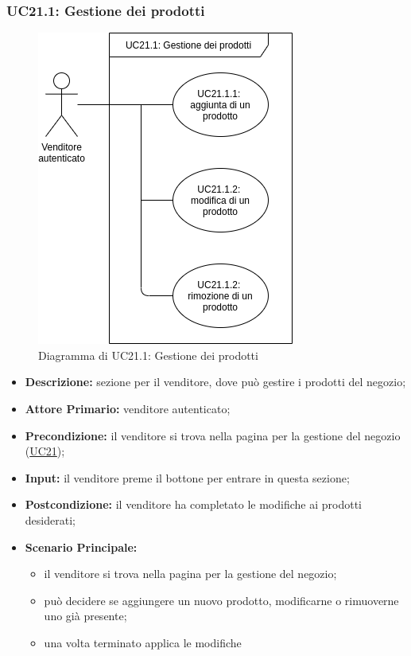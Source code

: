         \subsubsection{UC21.1: Gestione dei prodotti}
        \label{sec:UC21.1}
        \begin{figure}[!ht]
            \caption{Diagramma di UC21.1: Gestione dei prodotti}
            \vspace{10px}
            \includegraphics[scale=0.5]{../../../Images/AnalisiRequisiti/UC21.1}
            \centering
        \end{figure}
        \begin{itemize}
            \item \textbf{Descrizione:} sezione per il venditore, dove può gestire i prodotti del negozio;
            \item \textbf{Attore Primario:} venditore autenticato;
            \item \textbf{Precondizione:} il venditore si trova nella pagina per la gestione del negozio (\hyperref[sec:UC21]{UC21});
            \item \textbf{Input:} il venditore preme il bottone per entrare in questa sezione;
            \item \textbf{Postcondizione:} il venditore ha completato le modifiche ai prodotti desiderati;
            \item \textbf{Scenario Principale:} 
                \begin{itemize}
                    \item il venditore si trova nella pagina per la gestione del negozio;
                    \item può decidere se aggiungere un nuovo prodotto, modificarne o rimuoverne uno già presente;
                    \item una volta terminato applica le modifiche
                \end{itemize}
        \end{itemize}

